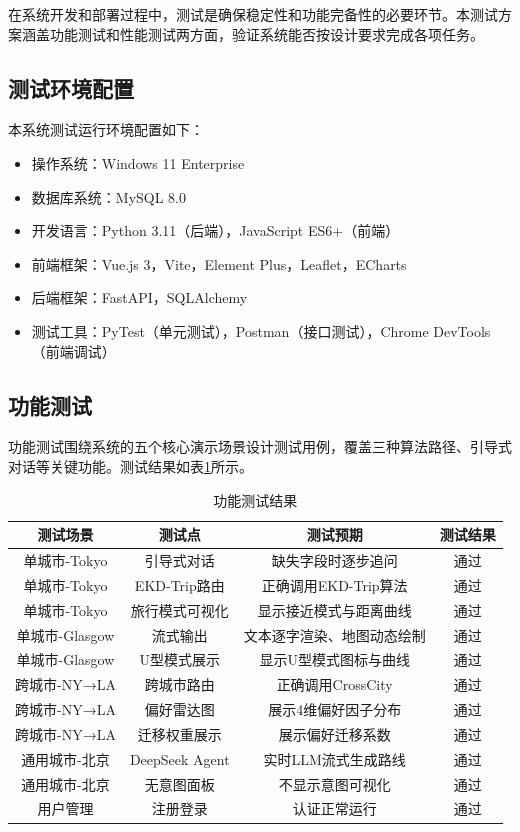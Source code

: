 在系统开发和部署过程中，测试是确保稳定性和功能完备性的必要环节。本测试方案涵盖功能测试和性能测试两方面，验证系统能否按设计要求完成各项任务。

\subsection{测试环境配置}
\label{sec:ch5_test_env}

本系统测试运行环境配置如下：

\begin{itemize}
  \item 操作系统：Windows 11 Enterprise
  \item 数据库系统：MySQL 8.0
  \item 开发语言：Python 3.11（后端），JavaScript ES6+（前端）
  \item 前端框架：Vue.js 3，Vite，Element Plus，Leaflet，ECharts
  \item 后端框架：FastAPI，SQLAlchemy
  \item 测试工具：PyTest（单元测试），Postman（接口测试），Chrome DevTools（前端调试）
\end{itemize}

\subsection{功能测试}
\label{sec:ch5_func_test}

功能测试围绕系统的五个核心演示场景设计测试用例，覆盖三种算法路径、引导式对话等关键功能。测试结果如表\ref{tab:ch5_functest}所示。

\begin{table}[hbt]
  \centering
  \caption{功能测试结果}
  \label{tab:ch5_functest}
  \begin{tabular*}{0.95\textwidth}{@{\extracolsep{\fill}}cccc}
  \toprule
    测试场景 & 测试点 & 测试预期 & 测试结果 \\
  \midrule
    单城市-Tokyo & 引导式对话 & 缺失字段时逐步追问 & 通过 \\
    单城市-Tokyo & EKD-Trip路由 & 正确调用EKD-Trip算法 & 通过 \\
    单城市-Tokyo & 旅行模式可视化 & 显示接近模式与距离曲线 & 通过 \\
    单城市-Glasgow & 流式输出 & 文本逐字渲染、地图动态绘制 & 通过 \\
    单城市-Glasgow & U型模式展示 & 显示U型模式图标与曲线 & 通过 \\
    跨城市-NY→LA & 跨城市路由 & 正确调用CrossCity & 通过 \\
    跨城市-NY→LA & 偏好雷达图 & 展示4维偏好因子分布 & 通过 \\
    跨城市-NY→LA & 迁移权重展示 & 展示偏好迁移系数 & 通过 \\
    通用城市-北京 & DeepSeek Agent & 实时LLM流式生成路线 & 通过 \\
    通用城市-北京 & 无意图面板 & 不显示意图可视化 & 通过 \\
    用户管理 & 注册登录 & 认证正常运行 & 通过 \\
  \bottomrule
  \end{tabular*}
\end{table}

